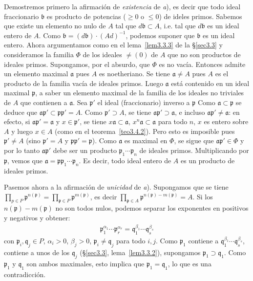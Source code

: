 \documentclass[bibtotoc,leqno,spanish]{amsbook}
\newcommand{\idl}[1]{\mathfrak{#1}}
\numberwithin{equation}{section}
\theoremstyle{note}
\theoremstyle{note}
\theoremstyle{rem}
\numberwithin{theorem}{section}
\numberwithin{proposition}{section}
\numberwithin{definition}{section}
\numberwithin{lemma}{section}
\numberwithin{corollary}{section}
\numberwithin{example}{section}
\numberwithin{footnote}{section}%
\begin{document}
Demostremos primero la afirmaci\'on de {\em existencia} de {\itshape a}), es decir que todo ideal fraccionario
$\idl{b}$ es producto de potencias ($\geq 0$ o $\leq 0$) de ideles primos. Sabemos que existe un
elemento no nulo de $A$ tal que $d\idl{b}\subset A$, i.e. tal que $d\idl{b}$ es un ideal entero de $A$.
Como $\idl{b} = (d\idl{b})\cdot(Ad)^{-1}$, podemos suponer que $\idl{b}$ es un ideal entero. Ahora
argumentamos como en el lema~\ref{lem3.3.3} de la \S\ref{sec3.3} y consideramos la familia $\Phi$ de los ideales $\neq(0)$ de
$A$ que no son productos de ideales primos. Supongamos, por el absurdo, que $\Phi$ es no vac\'ia. Entonces
admite un elemento maximal $\idl{a}$ pues $A$ es noetheriano. Se tiene $\idl{a}\neq A$ pues $A$ es el
producto de la familia vac\'ia de ideales primos. Luego $\idl{a}$ est\'a contenido en un ideal maximal
$\idl{p}$, a saber un elemento maximal de la familia de los ideales no triviales de $A$ que contienen
a $\idl{a}$. Sea $\idl{p}'$ el ideal (fraccionario) inverso a $\idl{p}$ Como $\idl{a}\subset\idl{p}$ se deduce que
$\idl{a}\idl{p}'\subset\idl{p}\idl{p}' = A$. Como $\idl{p}'\supset A$, se tiene $\idl{a}\idl{p}'\supset\idl{a}$,
e incluso $\idl{a}\idl{p}'\neq\idl{a}$: en efecto, si $\idl{a}\idl{p}' = \idl{a}$ y $x\in\idl{p}'$, se tiene
$x\idl{a}\subset\idl{a}$, $x^{n}\idl{a}\subset\idl{a}$ para todo $n$, $x$ es entero sobre $A$ y luego $x\in A$
(como en el teorema~\ref{teo3.4.2}). Pero esto es imposible pues $\idl{p}'\neq A$ (sino $\idl{p}' = A$ y $\idl{p}\idl{p}'=\idl{p}$).
Como $\idl{a}$ es maximal en $\Phi$, se sigue que $\idl{a}\idl{p}'\in\Phi$ y por lo tanto $\idl{a}\idl{p}'$ debe
ser un producto $\idl{p}_{1}\cdots\idl{p}_{n}$ de ideales primos. Multiplicando por $\idl{p}$, vemos que
$\idl{a} = \idl{p}\idl{p}_{1}\cdots\idl{p}_{n}$. Es decir, todo ideal entero de $A$ es un producto de ideales primos.

Pasemos ahora a la afirmaci\'on de {\em unicidad} de {\itshape a}). Supongamos que se tiene $\prod_{p\in P}\idl{p}^{n(\idl{p})}
=\prod_{\idl{p}\in P}\idl{p}^{m(\idl{p})}$, es decir $\prod_{\idl{p}\in A}\idl{p}^{n(\idl{p})-m(\idl{p})}=A$.
Si los $n(\idl{p})-m(\idl{p})$ no son todos nulos, podemos separar los exponentes en positivos y negativos y
obtener:
\begin{gather}
\idl{p}_{1}^{\alpha_{1}}\cdots\idl{p}_{r}^{\alpha_{r}} = \idl{q}_{1}^{\beta_{1}}\cdots\idl{q}_{s}^{\beta_{s}}
\end{gather}
con $\idl{p}_{i},\idl{q}_{j}\in P$, $\alpha_{i} > 0$, $\beta_{j} > 0$, $\idl{p}_{i}\neq\idl{q}_{j}$ para todo
$i, j$. Como $\idl{p}_{1}$ contiene a $\idl{q}_{1}^{\beta_{1}}\cdots\idl{q}_{s}^{\beta_{s}}$, contiene
a unos de los $\idl{q}_{j}$ (\S\ref{sec3.3}, lema~\ref{lem3.3.2}), supongamos $\idl{p}_{1}\supset\idl{q}_{1}$. Como
$\idl{p}_{1}$ y $\idl{q}_{1}$ son ambos maximales, esto implica que $\idl{p}_{1}=\idl{q}_{1}$, lo que
es una contradicci\'on.
\end{document}
